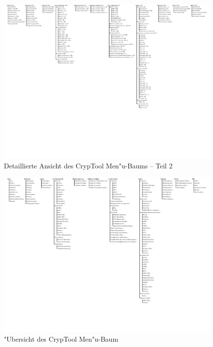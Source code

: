 \begin{figure}[b]
\begin{center}
\includegraphics[scale=1.1, clip, viewport=400 190 784 598]{figures/cryptool-menu-detail-de}
\caption{Detaillierte Ansicht des CrypTool Men"u-Baums -- Teil 2}
\label{menu-detail-2}
\end{center}
\end{figure}

\begin{figure}[hb]
\begin{center}
\includegraphics[scale=0.75, angle=270, viewport=14 107 779 590]{figures/cryptool-menu-de}
\vspace{-18pt}
\caption{"Ubersicht des CrypTool Men"u-Baum} 
\label{menuoverview}
\end{center}
\end{figure}
